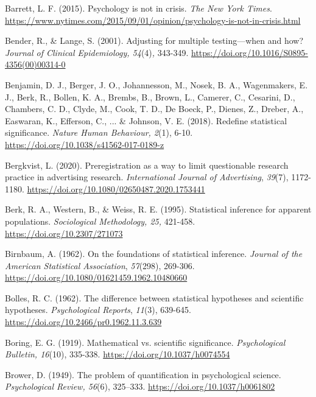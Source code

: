 \documentclass[authordate, meta]{jote-new-article}
\begin{document}
	Barrett, L. F. (2015). Psychology is not in crisis. \emph{The New York Times}. \url{https://www.nytimes.com/2015/09/01/opinion/psychology-is-not-in-crisis.html}



	Bender, R., \& Lange, S. (2001). Adjusting for multiple testing—when and how? \emph{Journal of Clinical Epidemiology, 54}(4)\emph{, }343-349. \url{https://doi.org/10.1016/S0895-4356(00)00314-0}



	Benjamin, D. J., Berger, J. O., Johannesson, M., Nosek, B. A., Wagenmakers, E. J., Berk, R., Bollen, K. A., Brembs, B., Brown, L., Camerer, C., Cesarini, D., Chambers, C. D., Clyde, M., Cook, T. D., De Boeck, P., Dienes, Z., Dreber, A., Easwaran, K., Efferson, C., ... \& Johnson, V. E. (2018). Redefine statistical significance. \emph{Nature Human Behaviour, 2}(1), 6-10. \url{https://doi.org/10.1038/s41562-017-0189-z}



	Bergkvist, L. (2020). Preregistration as a way to limit questionable research practice in advertising research. \emph{International Journal of Advertising}, \emph{39}(7), 1172-1180. \url{https://doi.org/10.1080/02650487.2020.1753441}



	Berk, R. A., Western, B., \& Weiss, R. E. (1995). Statistical inference for apparent populations. \emph{Sociological Methodology, 25,} 421-458. \url{https://doi.org/10.2307/271073}



	Birnbaum, A. (1962). On the foundations of statistical inference. \emph{Journal of the American Statistical Association}, \emph{57}(298), 269-306. \url{https://doi.org/10.1080/01621459.1962.10480660}



	Bolles, R. C. (1962). The difference between statistical hypotheses and scientific hypotheses. \emph{Psychological Reports}, \emph{11}(3), 639-645. \url{https://doi.org/10.2466/pr0.1962.11.3.639}



	Boring, E. G. (1919). Mathematical vs. scientific significance. \emph{Psychological Bulletin, 16}(10), 335-338. \url{https://doi.org/10.1037/h0074554}



	Brower, D. (1949). The problem of quantification in psychological science. \emph{Psychological Review, 56}(6), 325--333. \url{https://doi.org/10.1037/h0061802}
\end{document}

